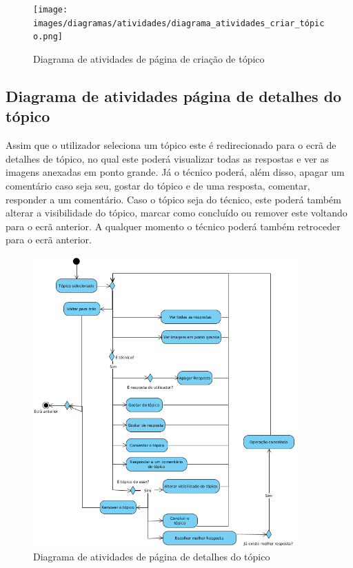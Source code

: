 \begin{figure}[htb]
    \centering
    \texttt{[image: images/diagramas/atividades/diagrama\_atividades\_criar\_tópico.png]}
    \caption{Diagrama de atividades de página de criação de tópico}
    \label{fig:37}
\end{figure}

\newpage

\subsection{Diagrama de atividades página de detalhes do tópico}

Assim que o utilizador seleciona um tópico este é redirecionado para o ecrã de detalhes de tópico, 
no qual este poderá visualizar todas as respostas e ver as imagens anexadas em ponto grande.
Já o técnico poderá, além disso, apagar um comentário caso seja seu, gostar do tópico e de uma resposta, 
comentar, responder a um comentário. Caso o tópico seja do técnico, este poderá também alterar a 
visibilidade do tópico, marcar como concluído ou remover este voltando para o ecrã anterior. 
A qualquer momento o técnico poderá também retroceder para o ecrã anterior.

\begin{figure}[htb]
    \centering
    \includegraphics[width=0.9\textwidth]{images/diagramas/atividades/diagrama_atividades_detalhes_topico.png}
    \caption{Diagrama de atividades de página de detalhes do tópico}
    \label{fig:38}
\end{figure}

